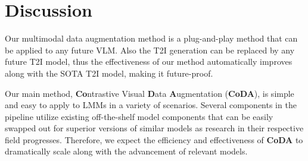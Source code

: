 \section{Discussion}
\label{sec:discussion}


Our multimodal data augmentation method is a plug-and-play method that can be applied to any future VLM. Also the T2I generation can be replaced by any future T2I model, thus the effectiveness of our method automatically improves along with the SOTA T2I model, making it future-proof.



Our main method, \textbf{Co}ntrastive Visual \textbf{D}ata \textbf{A}ugmentation (\textbf{CoDA}), is simple and easy to apply to LMMs in a variety of scenarios. Several components in the pipeline utilize existing off-the-shelf model components that can be easily swapped out for superior versions of similar models as research in their respective field progresses. Therefore, we expect the efficiency and effectiveness of \textbf{CoDA} to dramatically scale along with the advancement of relevant models. 

